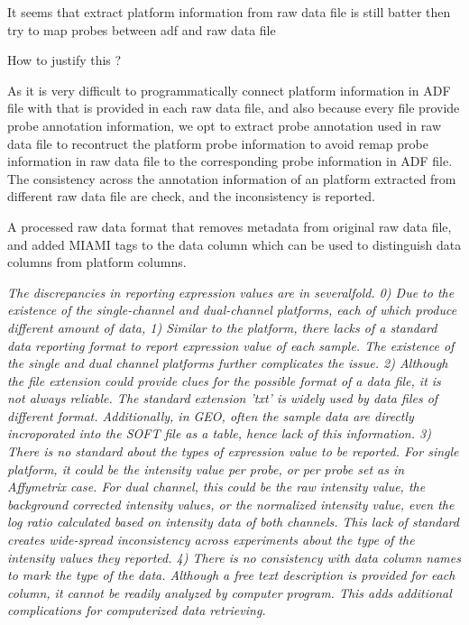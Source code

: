 It seems that extract platform information from raw data file is still
batter then try to map probes between adf and raw data file

How to justify this ?

As it is very difficult to programmatically connect platform information in
ADF file with that is provided in each raw data file, and also because every
file provide probe annotation information, we opt to extract probe annotation
used in raw data file to recontruct the platform probe information to avoid
remap probe information in raw data file to the corresponding probe
information in ADF file.
%
The consistency across the annotation information of an platform extracted
from different raw data file are check, and the inconsistency is reported.
%




%
%
A processed raw data format that removes metadata from original raw data
file, and added MIAMI tags to the data column which can be used to
distinguish data columns from platform columns.







\textit{The discrepancies in reporting expression values are in
  severalfold.
%
0) Due to the existence of the single-channel and dual-channel
platforms, each of which produce different amount of data,
%
1) Similar to the platform, there lacks of a standard data reporting format to
report expression value of each sample.  The existence of the single and dual
channel platforms further complicates the issue.  
%
2) Although the file extension could provide clues for the possible format of a
data file, it is not always reliable.  The standard extension 'txt' is widely
used by data files of different format.  Additionally, in GEO, often the sample
data are directly incroporated into the SOFT file as a table, hence lack of
this information.
%
3) There is no standard about the types of expression value to be reported.
For single platform, it could be the intensity value per probe, or per probe
set as in Affymetrix case.  For dual channel, this could be the raw intensity
value, the background corrected intensity values, or the normalized intensity
value, even the log ratio calculated based on intensity data of both channels.
%
This lack of standard creates wide-spread inconsistency across experiments
about the type of the intensity values they reported. 
%
4) There is no consistency with data column names to mark the type of the
data.  Although a free text description is provided for each column, it
cannot be readily analyzed by computer program.  This adds additional
complications for computerized data retrieving.  }















